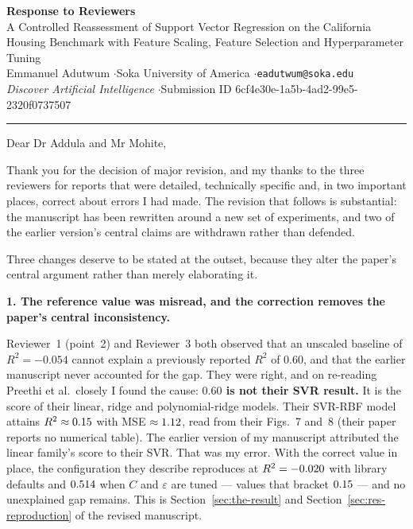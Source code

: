\documentclass[11pt,a4paper]{article}
\newcommand{\pt}[1]{\par\medskip\noindent\textbf{#1}\par}
\begin{document}
\begin{center}
{\Large\bfseries Response to Reviewers}\\[4pt]
{\large A Controlled Reassessment of Support Vector Regression on the California\\
Housing Benchmark with Feature Scaling, Feature Selection and Hyperparameter Tuning}\\[6pt]
Emmanuel Adutwum \quad$\cdot$\quad Soka University of America \quad$\cdot$\quad \texttt{eadutwum@soka.edu}\\[4pt]
\emph{Discover Artificial Intelligence} \quad$\cdot$\quad Submission ID 6cf4e30e-1a5b-4ad2-99e5-2320f0737507
\end{center}

\vspace{4pt}
\hrule
\vspace{10pt}

\noindent Dear Dr Addula and Mr Mohite,

Thank you for the decision of major revision, and my thanks to the three reviewers for
reports that were detailed, technically specific and, in two important places, correct
about errors I had made. The revision that follows is substantial: the manuscript has been
rewritten around a new set of experiments, and two of the earlier version's central claims
are withdrawn rather than defended.

Three changes deserve to be stated at the outset, because they alter the paper's central
argument rather than merely elaborating it.

\pt{1. The reference value was misread, and the correction removes the paper's central
inconsistency.}
Reviewer~1 (point~2) and Reviewer~3 both observed that an unscaled baseline of
$R^2 = -0.054$ cannot explain a previously reported $R^2$ of $0.60$, and that the earlier
manuscript never accounted for the gap. They were right, and on re-reading Preethi et al.\
closely I found the cause: \textbf{$0.60$ is not their SVR result.} It is the score of their
linear, ridge and polynomial-ridge models. Their SVR-RBF model attains
$R^2 \approx 0.15$ with MSE $\approx 1.12$, read from their
Figs.~7 and~8 (their paper reports no numerical table). The earlier version of my manuscript
attributed the linear family's score to their SVR. That was my error. With the correct value
in place, the configuration they describe reproduces at $R^2 = -0.020$ with
library defaults and $0.514$ when $C$ and $\varepsilon$ are tuned --- values that
bracket $0.15$ --- and no unexplained gap remains. This is
Section~\ref{sec:the-result} and Section~\ref{sec:res-reproduction} of the revised manuscript.
\end{document}
